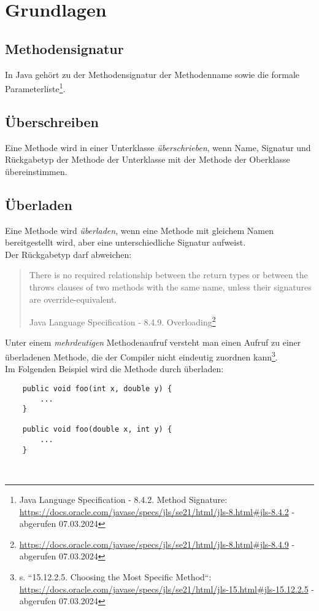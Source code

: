 \section{Grundlagen}

\subsection{Methodensignatur}
In Java gehört zu der Methodensignatur der Methodenname sowie die formale Parameterliste\footnote {
    Java Language Specification - 8.4.2. Method Signature: \url{https://docs.oracle.com/javase/specs/jls/se21/html/jls-8.html#jls-8.4.2} - abgerufen 07.03.2024
}.

\subsection{Überschreiben}
Eine Methode wird in einer Unterklasse \textit{überschrieben}, wenn Name, Signatur und Rückgabetyp der Methode der Unterklasse mit der
Methode der Oberklasse übereinstimmen.\\



\subsection{Überladen}
Eine Methode wird \textit{überladen}, wenn eine Methode mit gleichem Namen bereitgestellt wird, aber eine unterschiedliche Signatur
aufweist.\\
Der Rückgabetyp darf abweichen:
\blockquote[Java Language Specification - 8.4.9. Overloading\footnote{\url{https://docs.oracle.com/javase/specs/jls/se21/html/jls-8.html#jls-8.4.9} - abgerufen 07.03.2024}]{
    There is no required relationship between the return types or between the throws clauses of two methods with the same name, unless their signatures are override-equivalent.
}

\noindent
Unter einem \textit{mehrdeutigen} Methodenaufruf versteht man einen Aufruf zu einer überladenen Methode, die der Compiler nicht eindeutig zuordnen kann\footnote{
s. ``15.12.2.5. Choosing the Most Specific Method``: \url{https://docs.oracle.com/javase/specs/jls/se21/html/jls-15.html#jls-15.12.2.5} - abgerufen 07.03.2024
}.\\
Im Folgenden Beispiel wird die Methode  durch  überladen:

\begin{verbatim}
    public void foo(int x, double y) {
        ...
    }

    public void foo(double x, int y) {
        ...
    }
\end{verbatim}\\

